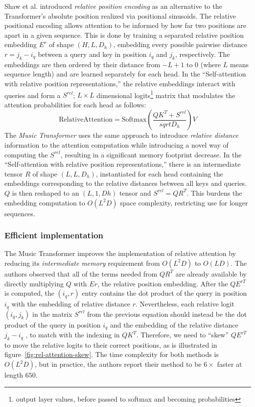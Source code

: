 Shaw et al.\cite{relative-positions} introduced \textit{relative position encoding} as an alternative to the Transformer's absolute position realized via positional sinusoids.
The relative positional encoding allows attention to be informed by how far two positions are apart in a given sequence.
This is done by training a separated relative position embedding $E^r$ of shape $(H, L, D_h)$, embedding every possible pairwise distance $r = j_k - i_q$ between a query and key in position $i_q$ and $j_k$, respectively.
The embeddings are then ordered by their distance from $-L + 1$ to $0$ (where $L$ means sequence length) and are learned separately for each head.
In the ``Self-attention with relative position representations,''\cite{relative-positions} the relative embeddings interact with queries and form a $S^{rel}$;
$L \times L$ dimensional logits\footnote{output layer values, before passed to softmax and becoming probabilities} matrix that modulates the attention probabilities for each head as follows\cite{music-transformer}:
\[
    \text{RelativeAttention} = \text{Softmax} \left( \frac{QK^T + S^{rel}}{sqrt{D_h}} \right) V
\]
The \textit{Music Transformer} uses the same approach to introduce \textit{relative distance} information to the attention computation while introducing a novel way of computing the $S^{rel}$, resulting in a significant memory footprint decrease.
In the ``Self-attention with relative position representations,''\cite{relative-positions} there is an intermediate tensor $R$ of shape $(L, L, D_h)$, instantiated for each head containing the embeddings corresponding to the relative distances between all keys and queries.
$Q$ is then reshaped to an $(L, 1, Dh)$ tensor and $S^{rel} = QR^T$.
This burdens the embedding computation to $O(L^2 D)$ space complexity, restricting use for longer sequences.~\cite{music-transformer}

\subsubsection{Efficient implementation}\label{subsubsec:efficient-implementation-of-relative-positional-encoding}

The Music Transformer improves the implementation of relative attention by reducing its \textit{intermediate memory} requirement from $O(L^2 D)$ to $O(LD)$.
The authors observed that all of the terms needed from $QR^T$ are already available by directly multiplying $Q$ with $Er$, the relative position embedding.
After the $QE^{rT}$ is computed, the $(i_q , r)$ entry contains the dot product of the query in position $i_q$ with the embedding of relative distance $r$.
Nevertheless, each relative logit $(i_q , j_k)$ in the matrix $S^{rel}$ from the previous equation should instead be the dot product of the query in position $i_q$ and the embedding of the relative distance $j_k - i_q$ , to match with the indexing in $QK^T$.
Therefore, we need to ``skew'' $QE^{rT}$ to move the relative logits to their correct positions, as is illustrated in figure~\ref{fig:rel-attention-skew}.
The time complexity for both methods is $O(L^2 D)$, but in practice, the authors report their method to be $6 \times$ faster at length $650$.~\cite{music-transformer}


